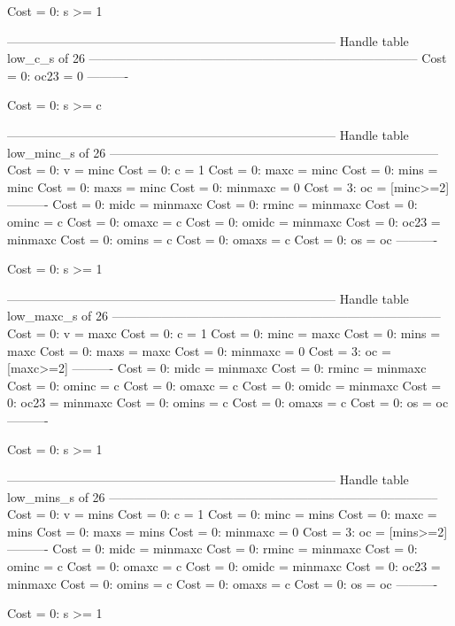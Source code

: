 Cost =  0:  s >= 1

--------------------------------------------------------------------------------
Handle table low_c_s of 26
--------------------------------------------------------------------------------
Cost =  0:  oc23 = 0
----------

Cost =  0:  s >= c

--------------------------------------------------------------------------------
Handle table low_minc_s of 26
--------------------------------------------------------------------------------
Cost =  0:  v       = minc
Cost =  0:  c       = 1
Cost =  0:  maxc    = minc
Cost =  0:  mins    = minc
Cost =  0:  maxs    = minc
Cost =  0:  minmaxc = 0
Cost =  3:  oc      = [minc>=2]
----------
Cost =  0:  midc    = minmaxc
Cost =  0:  rminc   = minmaxc
Cost =  0:  ominc   = c
Cost =  0:  omaxc   = c
Cost =  0:  omidc   = minmaxc
Cost =  0:  oc23    = minmaxc
Cost =  0:  omins   = c
Cost =  0:  omaxs   = c
Cost =  0:  os      = oc
----------

Cost =  0:  s >= 1

--------------------------------------------------------------------------------
Handle table low_maxc_s of 26
--------------------------------------------------------------------------------
Cost =  0:  v       = maxc
Cost =  0:  c       = 1
Cost =  0:  minc    = maxc
Cost =  0:  mins    = maxc
Cost =  0:  maxs    = maxc
Cost =  0:  minmaxc = 0
Cost =  3:  oc      = [maxc>=2]
----------
Cost =  0:  midc    = minmaxc
Cost =  0:  rminc   = minmaxc
Cost =  0:  ominc   = c
Cost =  0:  omaxc   = c
Cost =  0:  omidc   = minmaxc
Cost =  0:  oc23    = minmaxc
Cost =  0:  omins   = c
Cost =  0:  omaxs   = c
Cost =  0:  os      = oc
----------

Cost =  0:  s >= 1

--------------------------------------------------------------------------------
Handle table low_mins_s of 26
--------------------------------------------------------------------------------
Cost =  0:  v       = mins
Cost =  0:  c       = 1
Cost =  0:  minc    = mins
Cost =  0:  maxc    = mins
Cost =  0:  maxs    = mins
Cost =  0:  minmaxc = 0
Cost =  3:  oc      = [mins>=2]
----------
Cost =  0:  midc    = minmaxc
Cost =  0:  rminc   = minmaxc
Cost =  0:  ominc   = c
Cost =  0:  omaxc   = c
Cost =  0:  omidc   = minmaxc
Cost =  0:  oc23    = minmaxc
Cost =  0:  omins   = c
Cost =  0:  omaxs   = c
Cost =  0:  os      = oc
----------

Cost =  0:  s >= 1

